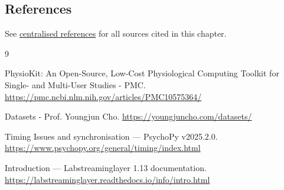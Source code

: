 \documentclass{report}
\begin{document}
\subsection*{References}
See \href{references.md}{centralised references} for all sources cited in this chapter.

\begin{thebibliography}{9}

	PhysioKit: An Open-Source, Low-Cost Physiological Computing Toolkit for Single- and Multi-User Studies - PMC.
	\url{https://pmc.ncbi.nlm.nih.gov/articles/PMC10575364/}

	Datasets - Prof. Youngjun Cho.
	\url{https://youngjuncho.com/datasets/}

	Timing Issues and synchronisation --- PsychoPy v2025.2.0.
	\url{https://www.psychopy.org/general/timing/index.html}

	Introduction --- Labstreaminglayer 1.13 documentation.
	\url{https://labstreaminglayer.readthedocs.io/info/intro.html}

\end{thebibliography}
\end{document}
